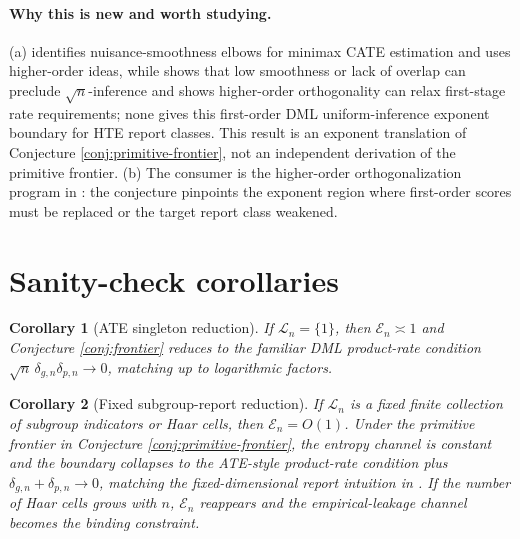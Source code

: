 \documentclass[11pt]{article}
\theoremstyle{definition}
\theoremstyle{plain}
\newtheorem{corollary}{Corollary}
\theoremstyle{remark}
\begin{document}
\paragraph{Why this is new and worth studying.}
(a) \citet[\S2--\S4]{KennedyBalakrishnanRobinsWasserman2024MinimaxCATE}
identifies nuisance-smoothness elbows for minimax CATE estimation and uses
higher-order ideas, while
\citet[abstract and pp.~1141--1142]{ArmstrongKolesar2021FiniteSampleATE} shows
that low smoothness or lack of overlap can preclude \(\sqrt n\)-inference and
\citet[abstract]{MackeySyrgkanisZadik2018OML} shows higher-order orthogonality
can relax first-stage rate requirements; none gives this first-order DML
uniform-inference exponent boundary for HTE report classes.  This result is an
exponent translation of Conjecture \ref{conj:primitive-frontier}, not an
independent derivation of the primitive frontier.
(b) The consumer is the higher-order orthogonalization program in
\citet{KennedyBalakrishnanRobinsWasserman2024MinimaxCATE}: the conjecture
pinpoints the exponent region where first-order scores must be replaced or the
target report class weakened.

\section{Sanity-check corollaries}
\begin{corollary}[ATE singleton reduction]\label{cor:ate}
If \(\mathcal{L}_n=\{1\}\), then \(\mathcal{E}_n\asymp1\) and Conjecture
\ref{conj:frontier} reduces to the familiar DML product-rate condition
\(\sqrt n\,\delta_{g,n}\delta_{p,n}\to0\), matching
\citet{ChernozhukovEtAl2018DML} up to logarithmic factors.
\end{corollary}

\begin{corollary}[Fixed subgroup-report reduction]\label{cor:fixed-subgroups}
If \(\mathcal{L}_n\) is a fixed finite collection of subgroup indicators or
Haar cells, then \(\mathcal{E}_n=O(1)\).  Under the primitive frontier in
Conjecture \ref{conj:primitive-frontier}, the entropy channel is constant and
the boundary collapses to the ATE-style product-rate condition plus
\(\delta_{g,n}+\delta_{p,n}\to0\), matching the fixed-dimensional report
intuition in \citet{SemenovaChernozhukov2021DMLCATE}.  If the number of Haar
cells grows with \(n\), \(\mathcal{E}_n\) reappears and the empirical-leakage
channel becomes the binding constraint.
\end{corollary}
\end{document}

